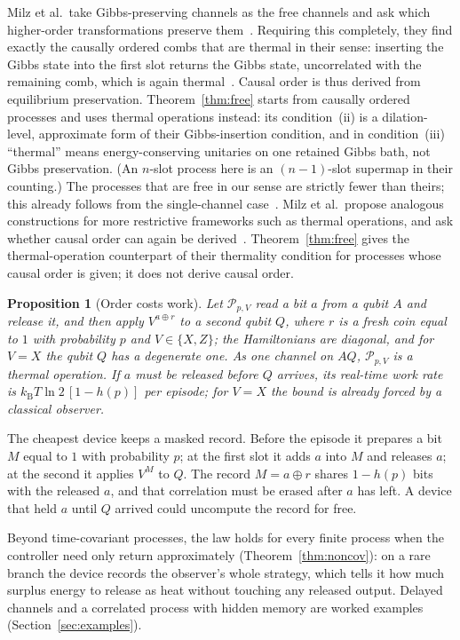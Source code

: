 \documentclass[11pt]{article}
\newtheorem{proposition}[theorem]{Proposition}
\theoremstyle{definition}
\theoremstyle{remark}
\newcommand{\kB}{k_{\mathrm B}}
\newcommand{\Pp}{\mathcal P}
\begin{document}
Milz et al.\ take Gibbs-preserving channels as the free channels and ask which higher-order transformations preserve them~\cite{Milz26}. Requiring this completely, they find exactly the causally ordered combs that are thermal in their sense: inserting the Gibbs state into the first slot returns the Gibbs state, uncorrelated with the remaining comb, which is again thermal~\cite[Def.~8, Thm.~6]{Milz26}. Causal order is thus derived from equilibrium preservation. Theorem~\ref{thm:free} starts from causally ordered processes and uses thermal operations instead: its condition~(ii) is a dilation-level, approximate form of their Gibbs-insertion condition, and in condition~(iii) ``thermal'' means energy-conserving unitaries on one retained Gibbs bath, not Gibbs preservation. (An $n$-slot process here is an $(n-1)$-slot supermap in their counting.) The processes that are free in our sense are strictly fewer than theirs; this already follows from the single-channel case~\cite{FOR15,HaagerupMusat11,DingFengHu21}. Milz et al.\ propose analogous constructions for more restrictive frameworks such as thermal operations, and ask whether causal order can again be derived~\cite[Sec.~VI]{Milz26}. Theorem~\ref{thm:free} gives the thermal-operation counterpart of their thermality condition for processes whose causal order is given; it does not derive causal order.

\begin{proposition}[Order costs work]\label{prop:order}
Let $\Pp_{p,V}$ read a bit $a$ from a qubit $A$ and release it, and then apply $V^{a\oplus r}$ to a second qubit $Q$, where $r$ is a fresh coin equal to $1$ with probability $p$ and $V\in\{X,Z\}$; the Hamiltonians are diagonal, and for $V=X$ the qubit $Q$ has a degenerate one. As one channel on $AQ$, $\Pp_{p,V}$ is a thermal operation. If $a$ must be released before $Q$ arrives, its real-time work rate is $\kB T\ln2\,[1-h(p)]$ per episode; for $V=X$ the bound is already forced by a classical observer.
\end{proposition}

The cheapest device keeps a masked record. Before the episode it prepares a bit $M$ equal to $1$ with probability $p$; at the first slot it adds $a$ into $M$ and releases $a$; at the second it applies $V^M$ to $Q$. The record $M=a\oplus r$ shares $1-h(p)$ bits with the released $a$, and that correlation must be erased after $a$ has left. A device that held $a$ until $Q$ arrived could uncompute the record for free.

Beyond time-covariant processes, the law holds for every finite process when the controller need only return approximately (Theorem~\ref{thm:noncov}): on a rare branch the device records the observer's whole strategy, which tells it how much surplus energy to release as heat without touching any released output. Delayed channels and a correlated process with hidden memory are worked examples (Section~\ref{sec:examples}).
\end{document}
